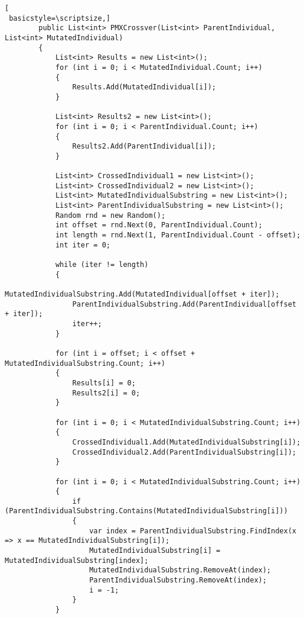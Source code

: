 \begin{program}[h!]
\begin{lstlisting}[
 basicstyle=\scriptsize,]
        public List<int> PMXCrossver(List<int> ParentIndividual, List<int> MutatedIndividual)
        {
            List<int> Results = new List<int>();
            for (int i = 0; i < MutatedIndividual.Count; i++)
            {
                Results.Add(MutatedIndividual[i]);
            }

            List<int> Results2 = new List<int>();
            for (int i = 0; i < ParentIndividual.Count; i++)
            {
                Results2.Add(ParentIndividual[i]);
            }

            List<int> CrossedIndividual1 = new List<int>();
            List<int> CrossedIndividual2 = new List<int>();
            List<int> MutatedIndividualSubstring = new List<int>();
            List<int> ParentIndividualSubstring = new List<int>();
            Random rnd = new Random();
            int offset = rnd.Next(0, ParentIndividual.Count);
            int length = rnd.Next(1, ParentIndividual.Count - offset);
            int iter = 0;

            while (iter != length)
            {
                MutatedIndividualSubstring.Add(MutatedIndividual[offset + iter]);
                ParentIndividualSubstring.Add(ParentIndividual[offset + iter]);
                iter++;
            }

            for (int i = offset; i < offset + MutatedIndividualSubstring.Count; i++)
            {
                Results[i] = 0;
                Results2[i] = 0;
            }

            for (int i = 0; i < MutatedIndividualSubstring.Count; i++)
            {
                CrossedIndividual1.Add(MutatedIndividualSubstring[i]);
                CrossedIndividual2.Add(ParentIndividualSubstring[i]);
            }

            for (int i = 0; i < MutatedIndividualSubstring.Count; i++)
            {
                if (ParentIndividualSubstring.Contains(MutatedIndividualSubstring[i]))
                {
                    var index = ParentIndividualSubstring.FindIndex(x => x == MutatedIndividualSubstring[i]);
                    MutatedIndividualSubstring[i] = MutatedIndividualSubstring[index];
                    MutatedIndividualSubstring.RemoveAt(index);
                    ParentIndividualSubstring.RemoveAt(index);
                    i = -1;
                }
            }


\end{lstlisting}
\end{program}
